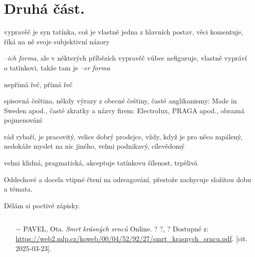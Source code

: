 \documentclass{article}
\begin{document}
\section{Druhá část.}
\begin{description}
    \setlength\itemsep{0.15em}
    \item[vypravěč:] vypravěč je syn tatínka, což je vlastně jedna z hlavních postav, věci komentuje, říká na ně svoje subjektivní názory
    \item[vyprávěcí způsoby:] \textit{--ich forma}, ale v některých příbězích vypravěč vůbec nefiguruje, vlastně vypráví o tatínkovi, takže tam je \textit{--er forma}
    \item[typy promluv:] nepřímá řeč, přímá řeč
    \item[jazyková stránka:] spisovná čeština, někdy výrazy z obecné češtiny, časté anglikanismy: Made in Sweden apod., časté zkratky a názvy firem: Electrolux, PRAGA apod., obrazná pojmenování
    \item[postavy:]
        \begin{description}
            \setlength\itemsep{0.15em}
 			\item[tatínek,] rád rybaří, je pracovitý, velice dobrý prodejce, vždy, když je pro něco zapálený, nedokáže myslet na nic jiného, velmi podnikavý, cílevědomý
            \item[maminka,] velmi klidná, pragmatická, akceptuje tatínkovu šílenost, trpělivá
        \end{description}
    \item[názor:] Oddechové a docela vtipné čtení na odreagování, přestože zachycuje složitou dobu a témata.
    \item[kontext:]  Dělám si poctivé zápisky.
    \item[zdroje:] $ $
    \begin{itemize}
        \setlength\itemsep{0em}
        \item[$-$] PAVEL, Ota. \textit{Smrt krásných srnců} Online. ? ?, ? Dostupné z: \url{https://web2.mlp.cz/koweb/00/04/52/92/27/smrt_krasnych_srncu.pdf}. [cit. 2025-03-23].
    \end{itemize}
\end{description}
\end{document}
